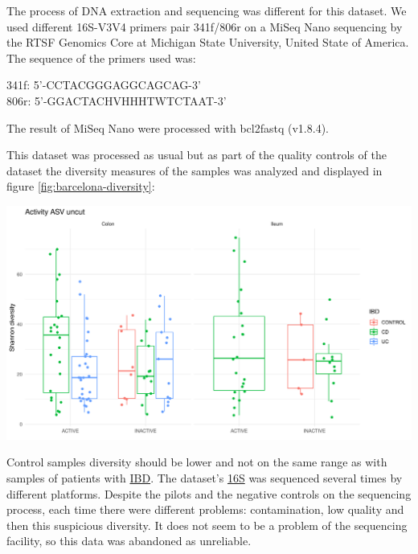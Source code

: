 \documentclass[
  12pt,
  a4paper,
  twoside,
  openright]{book}
\let\origfigure\figure
\let\endorigfigure\endfigure
\renewenvironment{figure}[1][2] {
    \expandafter\origfigure\expandafter[!htbp]
} {
    \endorigfigure
}
\begin{document}
The process of DNA extraction and sequencing was different for this dataset.
We used different 16S-V3V4 primers pair 341f/806r on a MiSeq Nano sequencing by the RTSF Genomics Core at Michigan State University, United State of America.
The sequence of the primers used was:

341f: 5'-CCTACGGGAGGCAGCAG-3'\\
806r: 5'-GGACTACHVHHHTWTCTAAT-3'

The result of MiSeq Nano were processed with bcl2fastq (v1.8.4).

This dataset was processed as usual but as part of the quality controls of the dataset the diversity measures of the samples was analyzed and displayed in figure \ref{fig:barcelona-diversity}:

\begin{figure}
\includegraphics[width=1\linewidth]{images/barcelona-diversity} \caption[Diversity indices of Barcelona according to the location and disease status.]{Diversity indices of Barcelona according to the location and disease status. There is a lot of diversity between different groups but importantly the control samples overlap with the patients with inflammatory bowel disease.}\label{fig:barcelona-diversity}
\end{figure}

Control samples diversity should be lower and not on the same range as with samples of patients with \protect\hyperlink{acronyms_IBD}{IBD}.
The dataset's \protect\hyperlink{acronyms_16S}{16S} was sequenced several times by different platforms.
Despite the pilots and the negative controls on the sequencing process, each time there were different problems: contamination, low quality and then this suspicious diversity.
It does not seem to be a problem of the sequencing facility, so this data was abandoned as unreliable.
\end{document}
